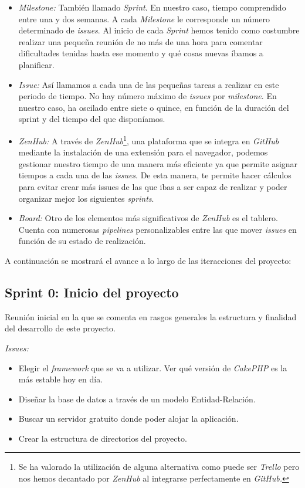 \begin{itemize}
	\item \textit{Milestone:} También llamado \textit{Sprint}. En nuestro caso, tiempo comprendido entre una y dos semanas. A cada \textit{Milestone} le corresponde un número determinado de \textit{issues}. Al inicio de cada \textit{Sprint} hemos tenido como costumbre realizar una pequeña reunión de no más de una hora para comentar dificultades tenidas hasta ese momento y qué cosas nuevas íbamos a planificar.
	
	\item \textit{Issue:} Así llamamos a cada una de las pequeñas tareas a realizar en este periodo de tiempo. No hay número máximo de \textit{issues} por \textit{milestone}. En nuestro caso, ha oscilado entre siete o quince, en función de la duración del sprint y del tiempo del que disponíamos.
	
	\item \textit{ZenHub:} A través de \textit{ZenHub}\footnote{Se ha valorado la utilización de alguna alternativa como puede ser \textit{Trello} pero nos hemos decantado por \textit{ZenHub} al integrarse perfectamente en \textit{GitHub.}}, una plataforma que se integra en \textit{GitHub} mediante la instalación de una extensión para el navegador, podemos gestionar nuestro tiempo de una manera más eficiente ya que permite asignar tiempos a cada una de las \textit{issues}. De esta manera, te permite hacer cálculos para evitar crear más issues de las que ibas a ser capaz de realizar y poder organizar mejor los siguientes \textit{sprints}.
	
	\item \textit{Board:} Otro de los elementos más significativos de \textit{ZenHub} es el tablero. Cuenta con numerosas \textit{pipelines} personalizables entre las que mover \textit{issues} en función de su estado de realización. 
\end{itemize}

A continuación se mostrará el avance a lo largo de las iteracciones del proyecto:

\subsection{Sprint 0: Inicio del proyecto}

Reunión inicial en la que se comenta en rasgos generales la estructura y finalidad del desarrollo de este proyecto. 

\textit{Issues:}
\begin{itemize}
	\item Elegir el \textit{framework} que se va a utilizar. Ver qué versión de \textit{CakePHP} es la más estable hoy en día.
	\item Diseñar la base de datos a través de un modelo Entidad-Relación. 
	\item Buscar un servidor gratuito donde poder alojar la aplicación.
	\item Crear la estructura de directorios del proyecto.
\end{itemize}

